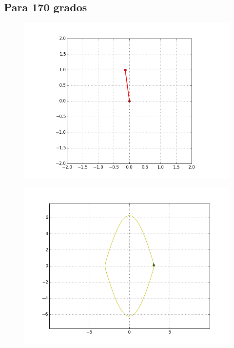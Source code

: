 \documentclass[12pt]{article}
\begin{document}
\subsection{Para 170 grados}
\begin{figure}[H]
\includegraphics[scale=.6]{170p}
\end{figure}
\begin{figure}[H]
\includegraphics[scale=.6]{170e}
\end{figure}
\end{document}
